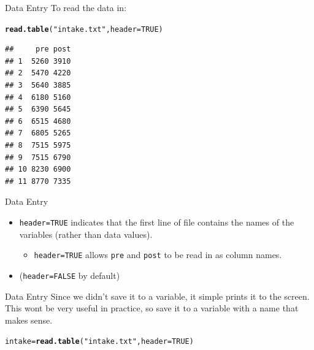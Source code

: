 \documentclass[xcolor=svgnames, 10pt]{beamer}
\makeatletter
\newcommand{\hlnum}[1]{\textcolor[rgb]{0.686,0.059,0.569}{#1}}%
\newcommand{\hlstr}[1]{\textcolor[rgb]{0.192,0.494,0.8}{#1}}%
\newcommand{\hlstd}[1]{\textcolor[rgb]{0.345,0.345,0.345}{#1}}%
\newcommand{\hlkwb}[1]{\textcolor[rgb]{0.69,0.353,0.396}{#1}}%
\newcommand{\hlkwc}[1]{\textcolor[rgb]{0.333,0.667,0.333}{#1}}%
\newcommand{\hlkwd}[1]{\textcolor[rgb]{0.737,0.353,0.396}{\textbf{#1}}}%
\newenvironment{kframe}{%
 \def\at@end@of@kframe{}%
 \ifinner\ifhmode%
  \def\at@end@of@kframe{\end{minipage}}%
  \begin{minipage}{\columnwidth}%
 \fi\fi%
 \def\FrameCommand##1{\hskip\@totalleftmargin \hskip-\fboxsep
 \colorbox{shadecolor}{##1}\hskip-\fboxsep
     \hskip-\linewidth \hskip-\@totalleftmargin \hskip\columnwidth}%
 \MakeFramed {\advance\hsize-\width
   \@totalleftmargin\z@ \linewidth\hsize
   \@setminipage}}%
 {\par\unskip\endMakeFramed%
 \at@end@of@kframe}
\newenvironment{knitrout}{}{} %
\makeatother
\begin{document}
\begin{frame}[fragile]{Data Entry}
To read the data in:
\begin{knitrout}\footnotesize
{}\color{fgcolor}\begin{kframe}
\begin{alltt}
\hlkwd{read.table}\hlstd{(}\hlstr{"intake.txt"}\hlstd{,} \hlkwc{header}\hlstd{=}\hlnum{TRUE}\hlstd{)}
\end{alltt}
\begin{verbatim}
##     pre post
## 1  5260 3910
## 2  5470 4220
## 3  5640 3885
## 4  6180 5160
## 5  6390 5645
## 6  6515 4680
## 7  6805 5265
## 8  7515 5975
## 9  7515 6790
## 10 8230 6900
## 11 8770 7335
\end{verbatim}
\end{kframe}
\end{knitrout}
\end{frame}

\begin{frame}[fragile]{Data Entry}
\begin{itemize}
\item {\tt header=TRUE} indicates that the first line of file contains the names of the variables (rather than data values). 
\begin{itemize}
\item {\tt header=TRUE} allows {\tt pre} and {\tt post} to be read in as column names.
\end{itemize}
\item ({\tt header=FALSE} by default)
\end{itemize}
\end{frame}

\begin{frame}[fragile]{Data Entry}
Since we didn't save it to a variable, it simple prints it to the screen.  This wont be very useful in practice, so save it to a variable with a name that makes sense.
\begin{knitrout}\footnotesize
{}\color{fgcolor}\begin{kframe}
\begin{alltt}
\hlstd{intake} \hlkwb{=} \hlkwd{read.table}\hlstd{(}\hlstr{"intake.txt"}\hlstd{,} \hlkwc{header}\hlstd{=}\hlnum{TRUE}\hlstd{)}
\end{alltt}
\end{kframe}
\end{knitrout}
\end{frame}
\end{document}
